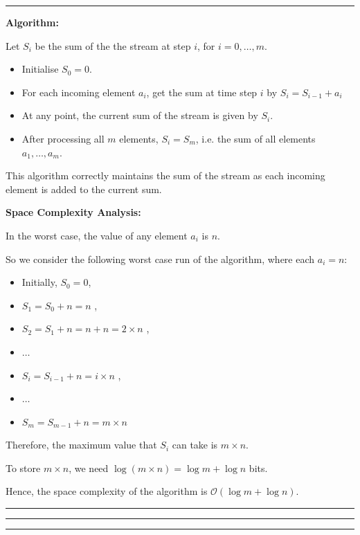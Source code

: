 \documentclass[11pt, english]{article}
\newenvironment{answer}{%
  \par\noindent\hrule %
  \vspace{0.25\baselineskip}%
  \noindent{\Large\bfseries Answer}\par\vspace{0.25\baselineskip}\noindent\ignorespaces
}{%
  \par\vspace{0.5\baselineskip}%
  \noindent\hrule\vspace{0.5\baselineskip}%
  \hrule\hrule
}
\begin{document}
\begin{answer}
  
\textbf{Algorithm:}

Let $S_{i}$ be the sum of the the stream at step $i$, for $i = 0, \ldots, m$.

\begin{itemize}
  \item Initialise $S_{0} = 0$.
  \item For each incoming element $a_{i}$, get the sum at time step $i$ by $S_{i} = S_{i-1} + a_{i}$
  \item At any point, the current sum of the stream is given by $S_{i}$.
  \item After processing all $m$ elements, $S_{i} = S_{m}$, i.e. the sum of all elements $a_1, \ldots, a_m$.
\end{itemize}

This algorithm correctly maintains the sum of the stream as each incoming element is added to the current sum.

\bigskip

\textbf{Space Complexity Analysis:}

In the worst case, the value of any element $a_{i}$ is $n$.

So we consider the following worst case run of the algorithm, where each $a_{i} = n$:
\begin{itemize}
  \item Initially, $S_{0} = 0$,
  \item $S_{1} = S_{0} + n = n$ ,
  \item $S_{2} = S_{1} + n = n + n = 2 \times n$ ,
  \item $\ldots$
  \item $S_{i} = S_{i-1} + n = i \times n$ ,
  \item $\ldots$
  \item $S_{m} = S_{m-1} + n = m \times n$
\end{itemize}

Therefore, the maximum value that $S_{i}$ can take is $m \times n$.

To store $m \times n$, we need $\log (m \times n) = \log m + \log n$ bits.

Hence, the space complexity of the algorithm is $\mathcal{O}(\log m + \log n)$.

\end{answer}

\vspace{1em}

\newpage
\end{document}
